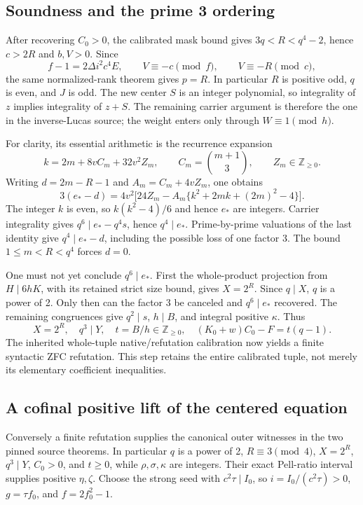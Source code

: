 \subsection{Soundness and the prime 3 ordering}

After recovering \(C_0>0\), the calibrated mask bound gives
\(3q<R<q^4-2\), hence \(c>2R\) and \(b,V>0\).  Since
\[
f-1=2\Delta i^2c^4E,\qquad V\equiv-c\pmod f,
\qquad V\equiv-R\pmod c,
\]
the same normalized-rank theorem gives \(p=R\).  In particular \(R\)
is positive odd, \(q\) is even, and \(J\) is odd.  The new center
\(S\) is an integer polynomial, so integrality of \(z\) implies
integrality of \(z+S\).  The remaining carrier argument is therefore
the one in the inverse-Lucas source; the weight enters only through
\(W\equiv1\pmod h\).

For clarity, its essential arithmetic is the recurrence expansion
\[
k=2m+8vC_m+32v^2Z_m,
\qquad C_m=\binom{m+1}{3},\qquad Z_m\in\mathbb Z_{\ge0}.
\]
Writing \(d=2m-R-1\) and \(A_m=C_m+4vZ_m\), one obtains
\[
3(e_*-d)=4v^2\bigl[24Z_m-A_m\{k^2+2mk+(2m)^2-4\}\bigr].
\]
The integer $k$ is even, so $k(k^2-4)/6$ and hence $e_*$ are integers.
Carrier integrality gives \(q^6\mid e_*-q^4s\), hence
\(q^4\mid e_*\).  Prime-by-prime valuations of the last identity give
\(q^4\mid e_*-d\), including the possible loss of one factor 3.
The bound \(1\le m<R<q^4\) forces \(d=0\).

One must not yet conclude \(q^6\mid e_*\).  First the whole-product
projection from \(H\mid6hK\), with its retained strict size bound,
gives \(X=2^R\).  Since \(q\mid X\), \(q\) is a power of 2.  Only
then can the factor 3 be canceled and \(q^6\mid e_*\) recovered.
The remaining congruences give \(q^2\mid s\), \(h\mid B\), and
integral positive \(\kappa\).  Thus
\[
X=2^R,\quad q^3\mid Y,\quad t=B/h\in\mathbb Z_{\ge0},\quad
(K_0+w)C_0-F=t(q-1).
\]
The inherited whole-tuple native/refutation calibration now yields a
finite syntactic ZFC refutation.  This step retains the entire calibrated
tuple, not merely its elementary coefficient inequalities.

\subsection{A cofinal positive lift of the centered equation}

Conversely a finite refutation supplies the canonical outer witnesses in
the two pinned source theorems.  In particular \(q\) is a power of 2,
\(R\equiv3\pmod4\), \(X=2^R\), \(q^3\mid Y\), \(C_0>0\),
and \(t\ge0\), while \(\rho,\sigma,\kappa\) are integers.
Their exact Pell-ratio interval supplies positive \(\eta,\zeta\).
Choose the strong seed with \(c^2\tau\mid I_0\), so
\(i=I_0/(c^2\tau)>0\), \(g=\tau f_0\), and \(f=2f_0^2-1\).

